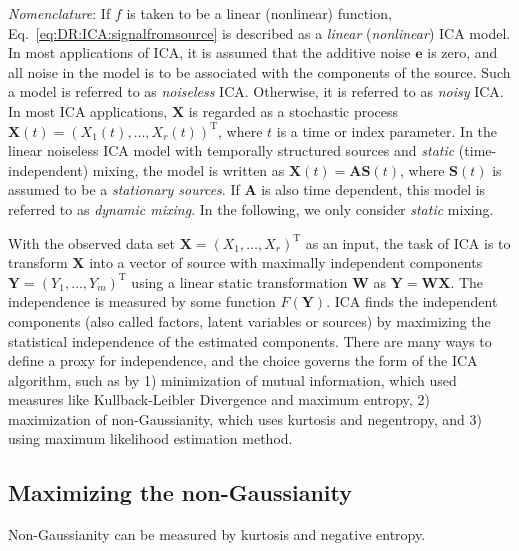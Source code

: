\textit{Nomenclature}: If $f$ is taken to be a linear (nonlinear) function, Eq.~\ref{eq:DR:ICA:signalfromsource} is described as a \textit{linear} (\textit{nonlinear}) ICA model. In most applications of ICA, it is assumed that the additive noise $\mathbf{e}$ is zero, and all noise in the model is to be associated with the components of the source. Such a model is referred to as \textit{noiseless} ICA. Otherwise, it is referred to as \textit{noisy} ICA. In most ICA applications, $\mathbf{X}$ is regarded as a stochastic process $\mathbf{X}(t) = (X_1(t), \dots, X_r(t))^{\operatorname{T}}$, where $t$ is a time or index parameter. In the linear noiseless ICA model with temporally structured sources and \textit{static} (time-independent) mixing, the model is written as $\mathbf{X}(t)=\mathbf{A}\mathbf{S}(t)$, where $\mathbf{S}(t)$ is assumed to be a \textit{stationary sources}. If $\mathbf{A}$ is also time dependent, this model is referred to as \textit{dynamic mixing}. In the following, we only consider \textit{static} mixing.

With the observed data set $\mathbf{X}=(X_1,\dots,X_r)^{\operatorname{T}}$ as an input, the task of ICA is to transform $\mathbf{X}$ into a vector of source with maximally independent components $\mathbf{Y}=(Y_1,\dots,Y_m)^{\operatorname{T}}$ using a linear static transformation $\mathbf{W}$ as $\mathbf{Y}=\mathbf{WX}$. The independence is measured by some function $F(\mathbf{Y})$. ICA finds the independent components (also called factors, latent variables or sources) by maximizing the statistical independence of the estimated components. There are many ways to define a proxy for independence, and the choice governs the form of the ICA algorithm, such as by 1) minimization of mutual information, which used measures like Kullback-Leibler Divergence and maximum entropy, 2) maximization of non-Gaussianity, which uses kurtosis and negentropy, and 3) using maximum likelihood estimation method. 

\subsection{Maximizing the non-Gaussianity\label{Sec:DR:ICA:MnG}}
Non-Gaussianity can be measured by kurtosis and negative entropy.
